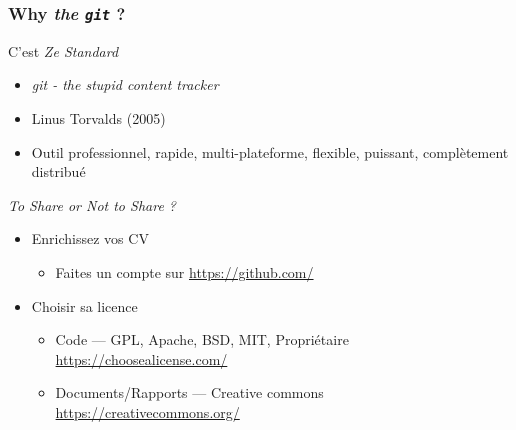 \documentclass[table,tikz,12pt,svgnames]{beamer}
\begin{document}
\begin{frame}
\frametitle{Why \textit{the \texttt{git}} ?}
\begin{block}{C'est \textit{Ze Standard}}
	\begin{itemize}
		\item \textit{git - the stupid content tracker}
		\item Linus Torvalds (2005)
		\item Outil professionnel, rapide, multi-plateforme, flexible, puissant, complètement distribué
	\end{itemize}
\end{block}
\begin{block}{\textit{To Share or Not to Share ?}}
	\begin{itemize}
		\item Enrichissez vos CV
		\begin{itemize}
			\item Faites un compte sur \url{https://github.com/}
		\end{itemize}
		\item Choisir sa licence
		\begin{itemize}
			\item Code --- GPL, Apache, BSD, MIT, Propriétaire \url{https://choosealicense.com/}
			\item Documents/Rapports --- Creative commons \url{https://creativecommons.org/}
		\end{itemize}
	\end{itemize}
\end{block}
\end{frame}

\end{document}
